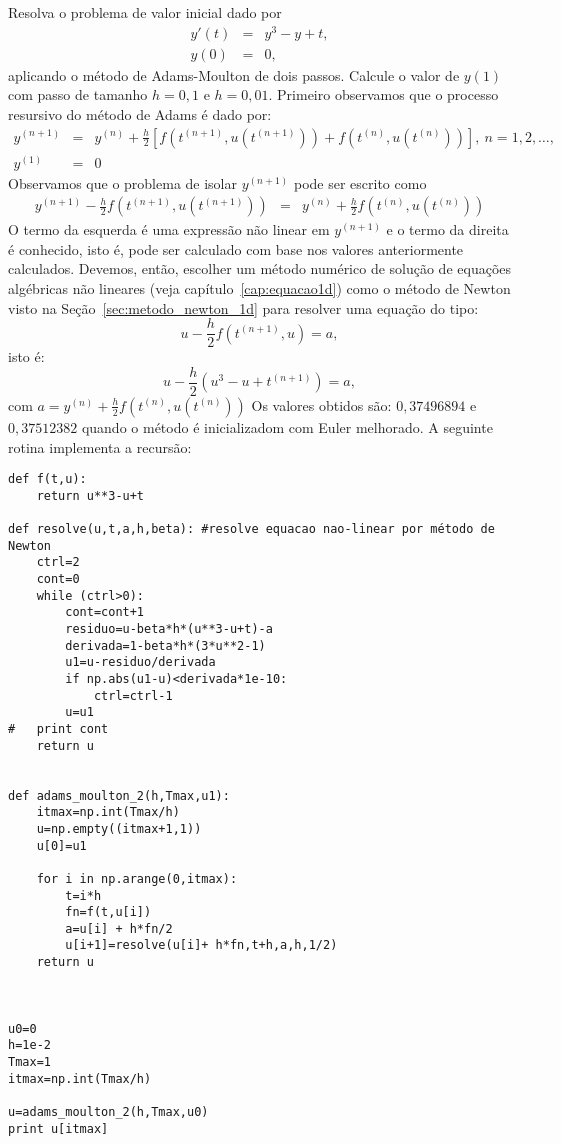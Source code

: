 \begin{exeresol}\label{exeresol:exersol_moulton_nl} Resolva o problema de valor inicial dado por
\begin{eqnarray}
 y'(t)&=& y^3-y+t,\\
 y(0)&=& 0,
\end{eqnarray}
aplicando o método de Adams-Moulton de dois passos. Calcule o valor de $y(1)$ com passo de tamanho $h=0,1$ e $h=0,01$.
Primeiro observamos que o processo resursivo do método de Adams é dado por:
\begin{eqnarray}
  y^{(n+1)}&=&y^{(n)}+\frac{h}{2}\left[f\left(t^{(n+1)},u(t^{(n+1)})\right)+f\left(t^{(n)},u(t^{(n)})\right)\right],~n=1,2,\ldots,\\
  y^{(1)}&=&0
 \end{eqnarray}
Observamos que o problema de isolar $y^{(n+1)}$ pode ser escrito como
\begin{eqnarray}
  y^{(n+1)}-\frac{h}{2}f\left(t^{(n+1)},u(t^{(n+1)})\right) &=&y^{(n)}+\frac{h}{2}f\left(t^{(n)},u(t^{(n)})\right)
 \end{eqnarray}
O termo da esquerda é uma expressão não linear em $y^{(n+1)}$ e o termo da direita é conhecido, isto é, pode ser calculado com base nos valores anteriormente calculados. Devemos, então, escolher um método numérico de solução de equações algébricas não lineares (veja capítulo~\ref{cap:equacao1d}) como o método de Newton visto na Seção~\ref{sec:metodo_newton_1d} para resolver uma equação do tipo:
\begin{equation} u-\frac{h}{2}f(t^{(n+1)},u)=a, \end{equation}
isto é:
\begin{equation} u-\frac{h}{2}\left(u^3-u+t^{(n+1)}\right)=a, \end{equation}
com $a=y^{(n)}+\frac{h}{2}f\left(t^{(n)},u(t^{(n)})\right)$
Os valores obtidos são: $0,37496894$ e $0,37512382$ quando o método é inicializadom com Euler melhorado.
\ifispython
A seguinte rotina implementa a recursão:
\begin{verbatim}
def f(t,u):
	return u**3-u+t

def resolve(u,t,a,h,beta): #resolve equacao nao-linear por método de Newton
	ctrl=2
	cont=0
	while (ctrl>0):
		cont=cont+1
		residuo=u-beta*h*(u**3-u+t)-a
		derivada=1-beta*h*(3*u**2-1)
		u1=u-residuo/derivada
		if np.abs(u1-u)<derivada*1e-10:
			ctrl=ctrl-1
		u=u1
#	print cont
	return u


def adams_moulton_2(h,Tmax,u1):
	itmax=np.int(Tmax/h)
	u=np.empty((itmax+1,1))
	u[0]=u1

	for i in np.arange(0,itmax):
		t=i*h
		fn=f(t,u[i])
		a=u[i] + h*fn/2
		u[i+1]=resolve(u[i]+ h*fn,t+h,a,h,1/2)
	return u



u0=0
h=1e-2
Tmax=1
itmax=np.int(Tmax/h)

u=adams_moulton_2(h,Tmax,u0)
print u[itmax]

\end{verbatim}

\fi
\end{exeresol}


